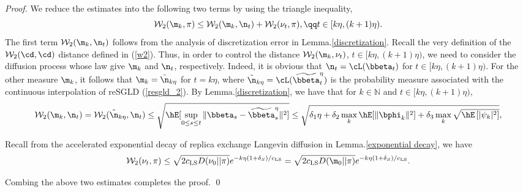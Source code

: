 \begin{proof}
We reduce the estimates into the following two terms by using the triangle inequality,
\begin{equation}\label{w2 triangle}
    \mathcal{W}_2(\m_{k}, \pi) \leq \mathcal{W}_2(\m_{k}, \n_t) + \mathcal{W}_2(\nu_t,\pi),\qq t\in[k\eta,(k+1)\eta).
\end{equation}
The first term $\mathcal{W}_2(\m_{k}, \n_t)$ follows from the analysis of discretization error in Lemma.\ref{discretization}.
Recall the very definition of the $\mathcal{W}_2(\cd,\cd)$ distance defined in (\ref{w2}). Thus, in order to control the distance $\mathcal{W}_2(\m_{k},\nu_t)$, $t\in[k\eta,(k+1)\eta)$, we need to consider the diffusion process whose law give $\m_{k}$ and $\n_t$, respectively. Indeed, it is obvious that $\n_t=\cL(\bbeta_t)$ for $t\in[k\eta,(k+1)\eta)$. For the other measure $\m_k$, it follows that $\m_{k}=\tilde \n_{k\eta}$ for $t=k\eta$, where $\tilde\n_{k\eta}=\cL(\widetilde \bbeta_t^{\eta})$ is the probability measure associated with the continuous interpolation of reSGLD (\ref{resgld_2}). By Lemma.\ref{discretization}, we have that for $k\in\mathbb{N}$ and $ t\in [k\eta,(k+1)\eta)$, 
\begin{equation}
    \mathcal{W}_2(\m_{k}, \n_t)=\mathcal{W}_2(\tilde\n_{k\eta}, \n_t) \leq \sqrt{\hE[\sup_{0\le s\le t}\|\bbeta_s- \widetilde \bbeta_s^{\eta}\|^2]}\leq \sqrt{\delta_1 \eta + \delta_2 \max_{k}\hE[\|\bphi_k\|^2]+\delta_3\max_{k}\sqrt{\hE\left[|\psi_{k}|^2\right]}},
\end{equation}

Recall from the accelerated exponential decay of replica exchange Langevin diffusion in Lemma.\ref{exponential decay}, we have
\begin{equation}
    \mathcal{W}_2(\nu_t,\pi)\leq \sqrt{2c_{\text{LS}}D(\nu_0||\pi)} e^{-k\eta(1+\delta_S)/c_{\text{LS}}}= \sqrt{2c_{\text{LS}}D(\m_0||\pi)} e^{-k\eta(1+\delta_S)/c_{\text{LS}}}.
\end{equation}

Combing the above two estimates completes the proof.
\qed
\end{proof}{}
